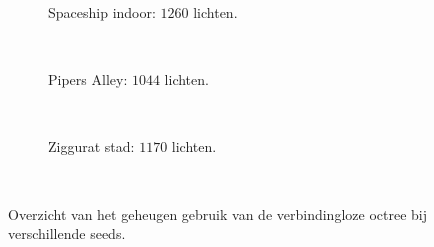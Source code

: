 \begin{figure}[p]
\begin{minipage}[t]{0.5\textwidth}
\begin{subfigure}[b]{0.75\textwidth}
\begin{adjustbox}{minipage=\textwidth, scale=0.4}
        \def\svgwidth{3.2725\textwidth}
        
      \end{adjustbox}
      \begin{center}
        \caption{Spaceship indoor: $1260$ lichten.}
      \end{center}
      \label{fig:hs-seed-memory::si-high}
    \end{subfigure}\\
    \begin{subfigure}[b]{0.75\textwidth}
      \begin{adjustbox}{minipage=\textwidth, scale=0.4}
        \def\svgwidth{3.2725\textwidth}
        
      \end{adjustbox}
      \begin{center}
        \caption{Pipers Alley: $1044$ lichten.}
      \end{center}
      \label{fig:hs-seed-memory::pa-high}
    \end{subfigure}\\
    \begin{subfigure}[b]{0.75\textwidth}
      \begin{adjustbox}{minipage=\textwidth, scale=0.4}
        \def\svgwidth{3.2725\textwidth}
        
      \end{adjustbox}
      \begin{center}
        \caption{Ziggurat stad: $1170$ lichten.}
      \end{center}
      \label{fig:hs-seed-memory::zc-high}
    \end{subfigure}\\
  \caption{Overzicht van het geheugen gebruik van de verbindingloze octree
           bij verschillende seeds.}
  \label{fig:hs-seed-memory}
\end{minipage}
\end{figure}
